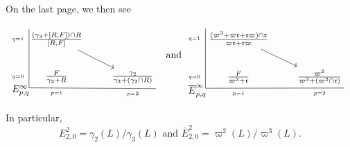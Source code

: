 \documentclass[a4paper,reqno,notitlepage]{amsart}
\theoremstyle{definition}
\newcommand\rr{{\mathfrak r}}
\begin{document}
On the last page, we then see
\[\begin{tikzpicture}[commutative diagrams/every diagram]
  \matrix[matrix of math nodes, name=m] {
    \frac{(\gamma_3+[R,F])\cap R}{[R,F]}\\
    \frac F{\gamma_2+R} & \frac{\gamma_2}{\gamma_3+(\gamma_2\cap R)}\\};
  \path[commutative diagrams/.cd, every arrow, every label]
  (m-1-1) edge (m-2-2);
  \node (x1) [xshift=-10mm,yshift=1mm] at (m-1-1.north) {};
  \node (x2) [xshift=-10mm,yshift=-4mm] at (m-2-1.center) {};
  \node (x3) [xshift=1mm,yshift=-4mm] at (m-2-2.east) {};
  \node at (m-1-1) [xshift=-14mm] {$\scriptscriptstyle q=1$};
  \node at (m-2-1) [xshift=-14mm] {$\scriptscriptstyle q=0$};
  \node at (m-2-1) [yshift=-6mm] {$\scriptscriptstyle p=1$};
  \node at (m-2-2) [yshift=-6mm] {$\scriptscriptstyle p=2$};
  \node at (m-2-1) [yshift=-5mm,xshift=-13mm] {$E^\infty_{p,q}$};
  \draw (x1) -- (x2.center) -- (x3);
\end{tikzpicture}\text{ and }
\begin{tikzpicture}[commutative diagrams/every diagram]
  \matrix[matrix of math nodes, name=m] {
    \frac{(\varpi^3+\varpi\rr+\rr\varpi)\cap\rr}{\varpi\rr+\rr\varpi}\\
    \frac F{\varpi^2+\rr} & \frac{\varpi^2}{\varpi^3+(\varpi^2\cap\rr)}\\};
  \path[commutative diagrams/.cd, every arrow, every label]
  (m-1-1) edge (m-2-2);
  \node (x1) [xshift=-12mm,yshift=1mm] at (m-1-1.north) {};
  \node (x2) [xshift=-12mm,yshift=-4mm] at (m-2-1.center) {};
  \node (x3) [xshift=1mm,yshift=-4mm] at (m-2-2.east) {};
  \node at (m-1-1) [xshift=-16mm] {$\scriptscriptstyle q=1$};
  \node at (m-2-1) [xshift=-16mm] {$\scriptscriptstyle q=0$};
  \node at (m-2-1) [yshift=-6mm] {$\scriptscriptstyle p=1$};
  \node at (m-2-2) [yshift=-6mm] {$\scriptscriptstyle p=2$};
  \node at (m-2-1) [yshift=-5mm,xshift=-15mm] {$\overline E^\infty_{p,q}$};
  \draw (x1) -- (x2.center) -- (x3);
\end{tikzpicture}\]

\noindent In particular,
\[E^2_{2,0}=\gamma_2(L)/\gamma_3(L)\text{ and }\overline E^2_{2,0}=\varpi^2(L)/\varpi^3(L).\]
\end{document}
